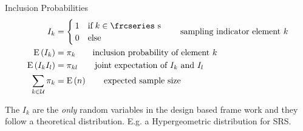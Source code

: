 \documentclass{beamer}\usepackage[]{graphicx}\usepackage[]{color}
\makeatletter
\def\maxwidth{ %
  \ifdim\Gin@nat@width>\linewidth
    \linewidth
  \else
    \Gin@nat@width
  \fi
}
\newenvironment{knitrout}{}{} %
\newcommand{\eqname}[1]{\tag*{#1}} %
\newcommand{\textfrc}[1]{{\frcseries#1}}
\newcommand{\mathfrc}[1]{\text{\textfrc{#1}}}
\newcommand{\E}[1]{\text{E}\left(#1\right)}
\makeatother
\begin{document}

\begin{frame}{Inclusion Probabilities}
\begin{align}
 I_k   &=   \begin{cases}   1  & \text{if}\; k \in \mathfrc{s} \\
                            0  & \text{else}  
          \end{cases}   \eqname{sampling indicator element $k$} \\
\E{I_k}     &  =   \pi_k    \eqname{inclusion probability of element $k$ } \\
\E{I_k I_l} &  =   \pi_{kl}  \eqname{joint expectation of $I_k$ and $I_l$} \\
\sum_{k \in \mathcal{U}}\pi_k & = \E{n} \eqname{expected sample size}
\end{align}

The $I_k$ are the \emph{only} random variables in the design based frame work and they follow a theoretical distribution. E.g. a Hypergeometric distribution for SRS. 

\end{frame}
\end{document}
